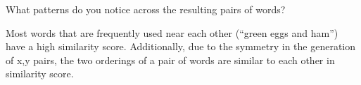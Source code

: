 \newpage

\problem[2]
What patterns do you notice across the resulting pairs of words?
\begin{solution}
    Most words that are frequently used near each other (``green eggs and ham'') have a high similarity score. Additionally, due to the symmetry in the generation of x,y pairs, the two orderings of a pair of words are similar to each other in similarity score.
\end{solution}



